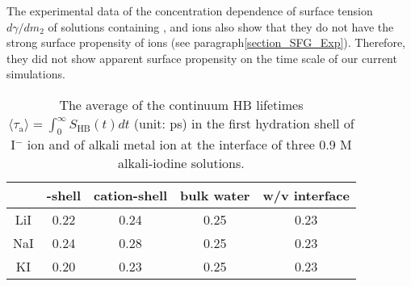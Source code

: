 The experimental data of the concentration dependence of surface tension $d\gamma/dm_2$ of solutions 
containing \Li, \Na and \K ions also show that they do not have the strong surface propensity of \I ions (see paragraph\thinspace\ref{section_SFG_Exp}).
Therefore, they did not show apparent surface propensity on the time scale of our current simulations.

%
\begin{table}[H]
\centering
\caption{\label{tab:tau_hb_alkali_iodine} 
The average of the continuum HB lifetimes $\langle\tau_{\text{a}}\rangle=\int_0^\infty S_\text{HB}(t) dt$ (unit: ps) in the first hydration shell of I$^-$ ion 
and of alkali metal ion at the interface of three 0.9 M alkali-iodine solutions.
}
\begin{tabular}{ccccc}
  &\I-shell &cation-shell & bulk water & w/v interface \\
\hline
 LiI & 0.22 & 0.24 & 0.25 & 0.23\\
 NaI & 0.24 & 0.28 & 0.25 & 0.23\\
 KI  & 0.20 & 0.23 & 0.25 &0.23\\
\end{tabular}
\end{table} 

